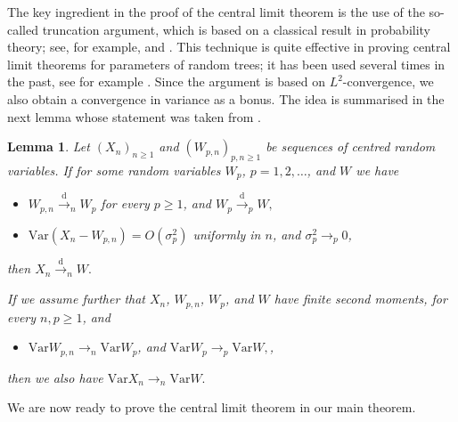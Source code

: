 \documentclass[article]{amsart}
\newcommand{\Var} {\mathrm {Var}}
\newcommand\dto{\overset{\mathrm{d}}{\to}}
\newtheorem{lemma}[theorem]{Lemma}
\theoremstyle{definition}
\theoremstyle{remark}
\begin{document}
 The key ingredient in the proof of the central limit theorem is the use of the so-called truncation argument, which is based on a classical result in probability theory; see, for example, \cite[Theorem 4.2]{billingsley1968convergence} and \cite[Theorem 4.28]{kallenberg2002foundations}. This technique is quite effective in proving central limit theorems for parameters of random trees; it has been used several times in the past, see for example \cite{holmgren2015limit, MR3984050, ralaivaosaona2020}. Since the argument is based on $L^{2}$-convergence, we also obtain a convergence in variance as a bonus. The idea is summarised in the next lemma whose statement was taken from \cite{ralaivaosaona2020}.
\begin{lemma}\label{lem:0}
	Let $(X_n)_{n\geq 1}$ and $(W_{p,n})_{p,n\geq 1}$ be sequences of centred random variables. If for some random variables $W_p$, $p = 1, 2, \dots$, and $W$ we have
	\begin{itemize}
		\item $W_{p,n}\dto_n W_p$ for every $p\geq 1$, and  $ W_p \dto_p W,$
		\item $\Var(X_n-W_{p,n})=O(\sigma^2_p)$ uniformly in $n$, and $\sigma^2_p\to_p0$,
	\end{itemize}
	then 
	$
	X_n\dto_n W.
	$
	
	If we assume further that $X_n$, $W_{p,n}$, $W_p$, and $W$ have finite second moments, for every $n,p \geq 1$, and 
	\begin{itemize}
	\item $\Var W_{p,n} {\to}_n \Var W_p$, and  $ \Var W_p {\to}_p \Var W,$,
	\end{itemize}
	then we also have $
	\Var X_n {\to}_n \Var W.  
	$ 

\end{lemma}

We are now ready to prove the central limit theorem in our main theorem.
\end{document}
